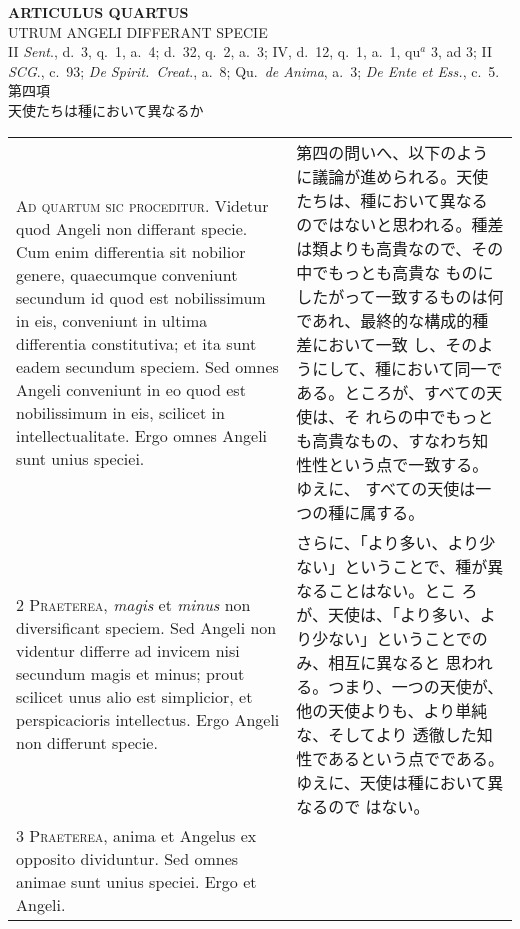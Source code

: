 \documentclass[10pt]{jsarticle} %
\begin{document}
\newpage

\begin{center}
 {\Large {\bf ARTICULUS QUARTUS}}\\
 {\large UTRUM ANGELI DIFFERANT SPECIE}\\
 {\footnotesize II {\itshape Sent}., d.~3, q.~1, a.~4; d.~32, q.~2,
 a.~3; IV, d.~12, q.~1, a.~1, qu$^a$ 3, ad 3; II {\itshape SCG}., c.~93;
 {\itshape De Spirit.~Creat}., a.~8; Qu.~{\itshape de Anima}, a.~3;
 {\itshape De Ente et Ess.}, c.~5.}\\
 {\Large 第四項\\天使たちは種において異なるか}
\end{center}

\begin{longtable}{p{21em}p{21em}}
{\huge A}{\scshape d quartum sic proceditur}. Videtur quod
Angeli non differant specie. Cum enim differentia sit nobilior genere,
quaecumque conveniunt secundum id quod est nobilissimum in eis,
conveniunt in ultima differentia constitutiva; et ita sunt eadem
secundum speciem. Sed omnes Angeli conveniunt in eo quod est
nobilissimum in eis, scilicet in intellectualitate. Ergo omnes Angeli
sunt unius speciei.


&

第四の問いへ、以下のように議論が進められる。天使たちは、種において異なる
 のではないと思われる。種差は類よりも高貴なので、その中でもっとも高貴な
 ものにしたがって一致するものは何であれ、最終的な構成的種差において一致
 し、そのようにして、種において同一である。ところが、すべての天使は、そ
 れらの中でもっとも高貴なもの、すなわち知性性という点で一致する。ゆえに、
 すべての天使は一つの種に属する。


\\


{\scshape 2 Praeterea}, {\itshape magis} et {\itshape minus} non diversificant
speciem. Sed Angeli non videntur differre ad invicem nisi secundum magis
et minus; prout scilicet unus alio est simplicior, et perspicacioris
intellectus. Ergo Angeli non differunt specie.


&
さらに、「より多い、より少ない」ということで、種が異なることはない。とこ
 ろが、天使は、「より多い、より少ない」ということでのみ、相互に異なると
 思われる。つまり、一つの天使が、他の天使よりも、より単純な、そしてより
 透徹した知性であるという点でである。ゆえに、天使は種において異なるので
 はない。

\\

{\scshape 3 Praeterea}, anima et Angelus ex opposito
dividuntur. Sed omnes animae sunt unius speciei. Ergo et Angeli.


\end{longtable}
\end{document}

